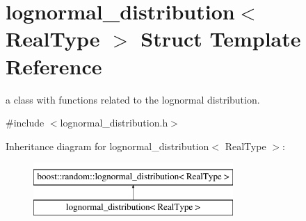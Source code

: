\hypertarget{structlognormal__distribution}{}\section{lognormal\+\_\+distribution$<$ Real\+Type $>$ Struct Template Reference}
\label{structlognormal__distribution}


a class with functions related to the lognormal distribution.  




{\ttfamily \#include $<$lognormal\+\_\+distribution.\+h$>$}

Inheritance diagram for lognormal\+\_\+distribution$<$ Real\+Type $>$\+:\begin{figure}[H]
\begin{center}
\leavevmode
\includegraphics[height=2.000000cm]{structlognormal__distribution}
\end{center}
\end{figure}
